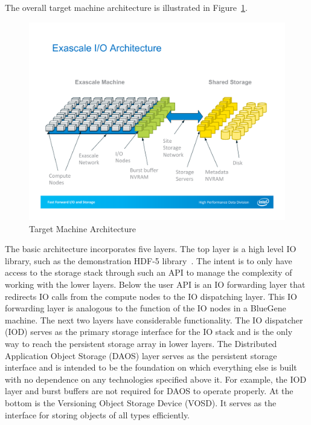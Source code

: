 \documentclass[conference]{IEEEtran}
\begin{document}
The overall target machine architecture is illustrated in
Figure~\ref{fig:architecture}.

\begin{figure}[ht]
\centering
\includegraphics[keepaspectratio=true, width=\columnwidth]{images/architecture}
\caption{Target Machine Architecture}
\label{fig:architecture}
\end{figure}

The basic architecture incorporates five layers. The top layer is a high level
IO library, such as the demonstration HDF-5 library~\cite{hdf5}. The intent is
to only have access to the storage stack through such an API to manage the
complexity of working with the lower layers. Below the user API is an IO
forwarding layer that redirects IO calls from the compute nodes to the IO
dispatching layer.  This IO forwarding layer is analogous to the function of
the IO nodes in a BlueGene machine. The next two layers have considerable
functionality. The IO dispatcher (IOD) serves as the primary storage interface
for the IO stack and is the only way to reach the persistent storage array in
lower layers. The Distributed Application Object Storage (DAOS) layer serves as
the persistent storage interface and is intended to be the foundation on which
everything else is built with no dependence on any technologies specified above
it. For example, the IOD layer and burst buffers are not required for DAOS to
operate properly. At the bottom is the Versioning Object Storage Device (VOSD).
It serves as the interface for storing objects of all types efficiently.
\end{document}
